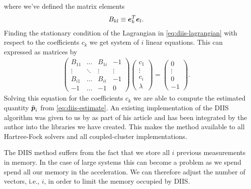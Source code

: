             where we've defined the matrix elements
            \begin{align}
                B_{kl} \equiv \boldsymbol{e}_k^T\boldsymbol{e}_l.
            \end{align}
            Finding the stationary condition of the Lagrangian in
            \autoref{eq:diis-lagrangian} with respect to the coefficients $c_k$
            we get system of $i$ linear equations.
            This can expressed as matrices by
            \begin{align}
                \begin{pmatrix}
                    B_{11} & \dots & B_{1i} & -1 \\
                    \vdots & \ddots & \vdots & \vdots \\
                    B_{i1} & \dots & B_{ii} & -1 \\
                    -1 & \dots & -1 & 0
                \end{pmatrix}
                \begin{pmatrix}
                    c_1 \\
                    \vdots \\
                    c_i \\
                    \lambda
                \end{pmatrix}
                = \begin{pmatrix}
                    0 \\
                    \vdots \\
                    0 \\
                    -1
                \end{pmatrix}.
            \end{align}
            Solving this equation for the coefficients $c_k$ we are able to
            compute the estimated quantity $\bar{\boldsymbol{p}}_i$ from
            \autoref{eq:diis-estimate}.
            An existing implementation of the DIIS algorithm was given to us by
            \citeauthor{rolf-nocc} as part of his article 
            \cite{rolf-nocc} and has been integrated by the author into the
            libraries we have created.
            This makes the method available to all Hartree-Fock solvers and all
            coupled-cluster implementations.

            The DIIS method suffers from the fact that we store all $i$ previous
            measurements in memory.
            In the case of large systems this can become a problem as we spend
            spend all our memory in the acceleration.
            We can therefore adjust the number of vectors, i.e., $i$, in order
            to limit the memory occupied by DIIS.

